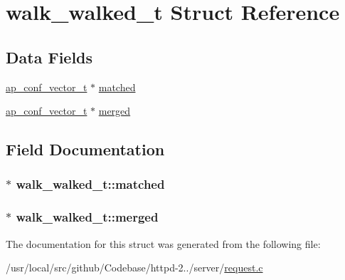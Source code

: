 \hypertarget{structwalk__walked__t}{}\section{walk\+\_\+walked\+\_\+t Struct Reference}
\label{structwalk__walked__t}
\subsection*{Data Fields}
\begin{DoxyCompactItemize}
\item 
\hyperlink{group__APACHE__CORE__CONFIG_ga614684670dbf748a70ac6bad272da59c}{ap\+\_\+conf\+\_\+vector\+\_\+t} $\ast$ \hyperlink{structwalk__walked__t_af2dbe56ea65c83326a1ff6d454f50d7e}{matched}
\item 
\hyperlink{group__APACHE__CORE__CONFIG_ga614684670dbf748a70ac6bad272da59c}{ap\+\_\+conf\+\_\+vector\+\_\+t} $\ast$ \hyperlink{structwalk__walked__t_a0e08d3ee759b167b8a9a42dd0bf516b8}{merged}
\end{DoxyCompactItemize}


\subsection{Field Documentation}
\subsubsection[{\texorpdfstring{matched}{matched}}]{$\ast$ walk\+\_\+walked\+\_\+t\+::matched}\hypertarget{structwalk__walked__t_af2dbe56ea65c83326a1ff6d454f50d7e}{}\label{structwalk__walked__t_af2dbe56ea65c83326a1ff6d454f50d7e}
\subsubsection[{\texorpdfstring{merged}{merged}}]{$\ast$ walk\+\_\+walked\+\_\+t\+::merged}\hypertarget{structwalk__walked__t_a0e08d3ee759b167b8a9a42dd0bf516b8}{}\label{structwalk__walked__t_a0e08d3ee759b167b8a9a42dd0bf516b8}


The documentation for this struct was generated from the following file\+:\begin{DoxyCompactItemize}
\item 
/usr/local/src/github/\+Codebase/httpd-\/2../server/\hyperlink{request_8c}{request.\+c}\end{DoxyCompactItemize}
